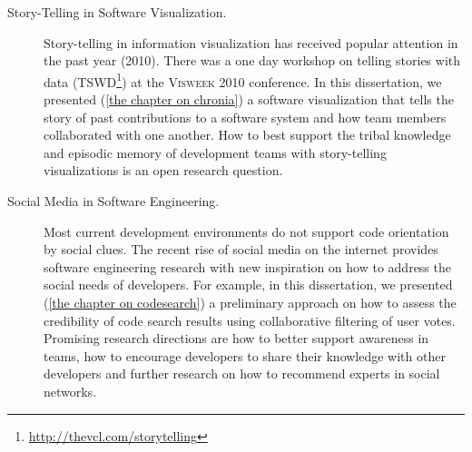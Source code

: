\begin{description}
\item[Story-Telling in Software Visualization.] 
%
Story-telling in information visualization has received popular attention in the past year (2010). There was a one day workshop on telling stories with data (TSWD\footnote{\url{http://thevcl.com/storytelling}}) at the \textsc{Visweek} 2010 conference. In this dissertation, we presented (\autoref{the chapter on chronia}) a software visualization that tells the story of past contributions to a software system and how team members collaborated with one another. How to best support the tribal knowledge and episodic memory of development teams with story-telling visualizations is an open research question.

\item[Social Media in Software Engineering.] 
%
Most current development environments do not support code orientation by social clues.  
The recent rise of social media on the internet provides software engineering research with new inspiration on how to address the social needs of developers. For example, in this dissertation, we presented (\autoref{the chapter on codesearch}) a preliminary approach on how to assess the credibility of code search results using collaborative filtering of user votes. Promising research directions are how to better support awareness in teams, how to encourage developers to share their knowledge with other developers and further research on how to recommend experts in social networks.

\item[]
\end{description}

